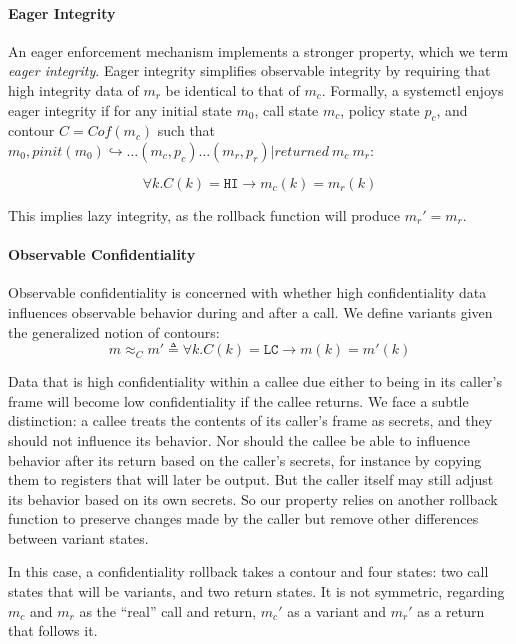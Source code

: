 \documentclass{article}
\begin{document}
    \paragraph{Eager Integrity}
 
      An eager enforcement mechanism implements a stronger property, which we term {\it eager integrity}.
      Eager integrity simplifies observable integrity by requiring that high integrity data of \(m_r\) be
      identical to that of \(m_c\). Formally, a systemctl enjoys eager integrity if for any initial state
      \(m_0\), call state \(m_c\), policy state \(p_c\), and contour \(C = Cof(m_c)\) such that
      \(m_0,\mathit{pinit}(m_0) \hookrightarrow \dots (m_c,p_c) \dots (m_r,p_r) | \mathit{returned}\ m_c\ m_r\):

      \[\forall k . C(k) = \mathtt{HI} \rightarrow m_c(k) = m_r(k)\]

      This implies lazy integrity, as the rollback function will produce \(m_r' = m_r\).
 
    \paragraph{Observable Confidentiality}

      Observable confidentiality is concerned with whether high confidentiality data influences
      observable behavior during and after a call. We define variants given the generalized notion
      of contours:
      \[m \approx_C m' \triangleq \forall k . C(k) = \mathtt{LC} \rightarrow m(k) = m'(k)\]

      Data that is high confidentiality within a callee due either to being in its caller's frame
      will become low confidentiality if the callee returns. We face a subtle distinction: 
      a callee treats the contents of its caller's frame as secrets, and they should not influence
      its behavior. Nor should the callee be able to influence behavior after its return based
      on the caller's secrets, for instance by copying them to registers that will later be output.
      But the caller itself may still adjust its behavior based on its own secrets. So our property
      relies on another rollback function to preserve changes made by the caller but remove other
      differences between variant states.

      In this case, a confidentiality rollback takes a contour and four states: two call states
      that will be variants, and two return states. It is not symmetric, regarding \(m_c\) and \(m_r\)
      as the ``real'' call and return, \(m_c'\) as a variant and \(m_r'\) as a return that follows it.
\end{document}
